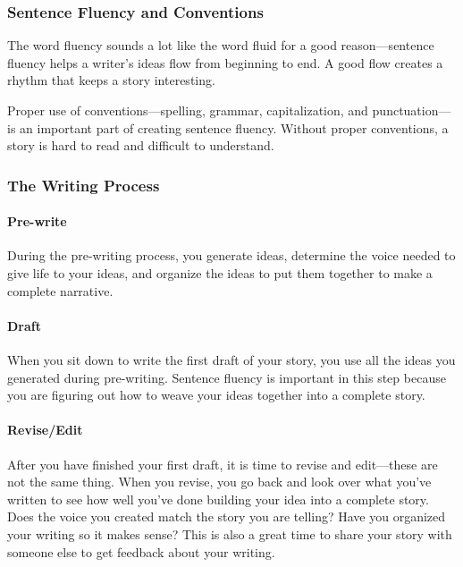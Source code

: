 \subsubsection*{Sentence Fluency and Conventions}

The word fluency sounds a lot like the word fluid for a good reason—sentence fluency helps a writer's ideas flow from beginning to end.
A good flow creates a rhythm that keeps a story interesting.

Proper use of conventions—spelling, grammar, capitalization, and punctuation—is an important part of creating sentence fluency.
Without proper conventions, a story is hard to read and difficult to understand.


\subsubsection*{The Writing Process}

\paragraph{Pre-write}

During the pre-writing process, you generate ideas, determine the voice needed to give life to your ideas, and organize the ideas to put them together to make a complete narrative.

\paragraph{Draft}

When you sit down to write the first draft of your story, you use all the ideas you generated during pre-writing. Sentence fluency is important in this step because you are figuring out how to weave your ideas together into a complete story.

\paragraph{Revise/Edit}

After you have finished your first draft, it is time to revise and edit—these are not the same thing. When you revise, you go back and look over what you've written to see how well you've done building your idea into a complete story. Does the voice you created match the story you are telling? Have you organized your writing so it makes sense? This is also a great time to share your story with someone else to get feedback about your writing.

